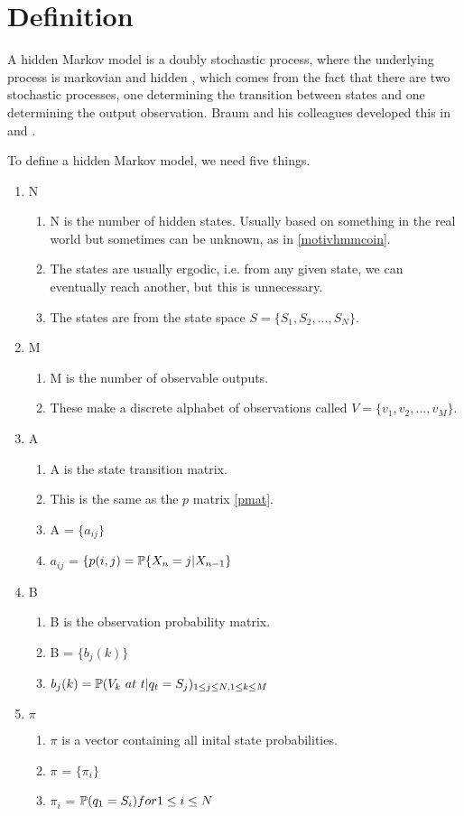 \section{Definition}

A hidden Markov model is a doubly stochastic process, where the underlying process is markovian and hidden \cite{1165342}, which comes from the fact that there are two stochastic processes, one determining the transition between states and one determining the output observation. Braum and his colleagues developed this in \cite{baum1967inequality} and \cite{baum1966}. 

To define a hidden Markov model, we need five things.
\begin{enumerate}
    \item N \begin{enumerate}[i]
        \item N is the number of hidden states. Usually based on something in the real world but sometimes can be unknown, as in \ref{motivhmmcoin}.
        \item The states are usually ergodic, i.e. from any given state, we can eventually reach another, but this is unnecessary.
        \item The states are from the state space $S = \{S_1,S_2,...,S_N\}$.
        \end{enumerate}
    \item M \begin{enumerate}[i]
        \item M is the number of observable outputs.
        \item These make a discrete alphabet of observations called $V = \{v_1, v_2,...,v_M\}$.
    \end{enumerate}
    \item A \begin{enumerate}[i]
        \item A is the state transition matrix.
        \item This is the same as the $p$ matrix \ref{pmat}. 
        \item A = $\{a_{ij}\}$ 
        \item $a_{ij}$ = $\{ p(i,j) = \mathbb{P} \{ X_n = j | X_{n-1}\}$
    \end{enumerate}
    \item B \begin{enumerate}[i]
        \item B is the observation probability matrix.
        \item B = $\{b_j(k)\}$
        \item $b_j(k) = \mathbb{P} (V_k \  at \  t | q_t = S_j)_{1 \leq j \leq N, 1 \leq k \leq M}$
    \end{enumerate}
    \item $\pi$ \begin{enumerate}[i]
        \item $\pi$ is a vector containing all inital state probabilities. 
        \item $\pi$ = $\{ \pi_i \}$
        \item $\pi_i$ = $\mathbb{P} (q_1 = S_i) for 1 \leq i \leq N$
    \end{enumerate}
\end{enumerate}

